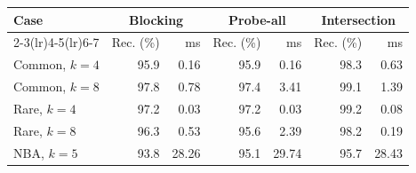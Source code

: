 \begin{tabular}{lrrrrrr}
\toprule
Case & \multicolumn{2}{c}{Blocking} & \multicolumn{2}{c}{Probe-all} & \multicolumn{2}{c}{Intersection}\\
\cmidrule(lr){2-3}\cmidrule(lr){4-5}\cmidrule(lr){6-7}
 & Rec. (\%) & ms & Rec. (\%) & ms & Rec. (\%) & ms\\
\midrule
Common, $k=4$ & 95.9 & 0.16 & 95.9 & 0.16 & 98.3 & 0.63\\
Common, $k=8$ & 97.8 & 0.78 & 97.4 & 3.41 & 99.1 & 1.39\\
Rare, $k=4$ & 97.2 & 0.03 & 97.2 & 0.03 & 99.2 & 0.08\\
Rare, $k=8$ & 96.3 & 0.53 & 95.6 & 2.39 & 98.2 & 0.19\\
NBA, $k=5$ & 93.8 & 28.26 & 95.1 & 29.74 & 95.7 & 28.43\\
\bottomrule
\end{tabular}
\vspace{-3mm}
